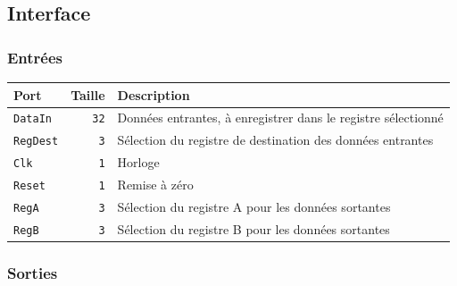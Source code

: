 \documentclass{article}
\begin{document}
    \subsection{Interface}

    \subsubsection{Entrées}

    \begin{tabular}{|l|r|l|}
        \hline
        \textbf{Port}   & \textbf{Taille} & \textbf{Description}                                          \\
        \hline

        \texttt{DataIn} & \texttt{32}     & Données entrantes, à enregistrer dans le registre sélectionné \\
        \hline
        \texttt{RegDest} & \texttt{3}      & Sélection du registre de destination des données entrantes    \\
        \hline
        \texttt{Clk}    & \texttt{1}      & Horloge                                                       \\
        \hline
        \texttt{Reset}  & \texttt{1}      & Remise à zéro                                                 \\
        \hline
        \texttt{RegA}   & \texttt{3}      & Sélection du registre A pour les données sortantes            \\
        \hline
        \texttt{RegB}   & \texttt{3}      & Sélection du registre B pour les données sortantes            \\

        \hline
    \end{tabular}

    \subsubsection{Sorties}
\end{document}
